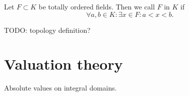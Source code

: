 \begin{definition}
Let $F\subset K$ be totally ordered fields. Then we call $F$  in $K$ if
\[ \forall a,b\in K: \exists x\in F: a<x<b. \]
\end{definition}
TODO: topology definition?

\chapter{Valuation theory}
Absolute values on integral domains.